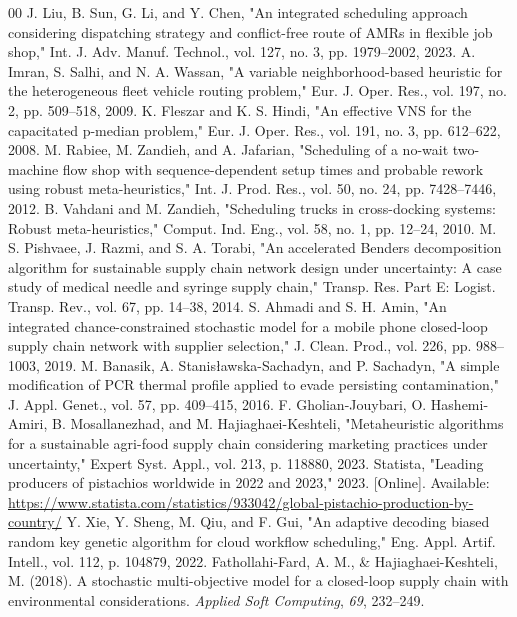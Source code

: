\documentclass[conference]{IEEEtran}
\begin{document}
\begin{thebibliography}{00}
     J. Liu, B. Sun, G. Li, and Y. Chen, "An integrated scheduling approach considering dispatching strategy and conflict-free route of AMRs in flexible job shop," Int. J. Adv. Manuf. Technol., vol. 127, no. 3, pp. 1979--2002, 2023.
     A. Imran, S. Salhi, and N. A. Wassan, "A variable neighborhood-based heuristic for the heterogeneous fleet vehicle routing problem," Eur. J. Oper. Res., vol. 197, no. 2, pp. 509--518, 2009.
     K. Fleszar and K. S. Hindi, "An effective VNS for the capacitated p-median problem," Eur. J. Oper. Res., vol. 191, no. 3, pp. 612--622, 2008.
     M. Rabiee, M. Zandieh, and A. Jafarian, "Scheduling of a no-wait two-machine flow shop with sequence-dependent setup times and probable rework using robust meta-heuristics," Int. J. Prod. Res., vol. 50, no. 24, pp. 7428--7446, 2012.
     B. Vahdani and M. Zandieh, "Scheduling trucks in cross-docking systems: Robust meta-heuristics," Comput. Ind. Eng., vol. 58, no. 1, pp. 12--24, 2010.
     M. S. Pishvaee, J. Razmi, and S. A. Torabi, "An accelerated Benders decomposition algorithm for sustainable supply chain network design under uncertainty: A case study of medical needle and syringe supply chain," Transp. Res. Part E: Logist. Transp. Rev., vol. 67, pp. 14--38, 2014.
     S. Ahmadi and S. H. Amin, "An integrated chance-constrained stochastic model for a mobile phone closed-loop supply chain network with supplier selection," J. Clean. Prod., vol. 226, pp. 988--1003, 2019.
     M. Banasik, A. Stanisławska-Sachadyn, and P. Sachadyn, "A simple modification of PCR thermal profile applied to evade persisting contamination," J. Appl. Genet., vol. 57, pp. 409--415, 2016.
     F. Gholian-Jouybari, O. Hashemi-Amiri, B. Mosallanezhad, and M. Hajiaghaei-Keshteli, "Metaheuristic algorithms for a sustainable agri-food supply chain considering marketing practices under uncertainty," Expert Syst. Appl., vol. 213, p. 118880, 2023.
     Statista, "Leading producers of pistachios worldwide in 2022 and 2023," 2023. [Online]. Available: \url{https://www.statista.com/statistics/933042/global-pistachio-production-by-country/}
     Y. Xie, Y. Sheng, M. Qiu, and F. Gui, "An adaptive decoding biased random key genetic algorithm for cloud workflow scheduling," Eng. Appl. Artif. Intell., vol. 112, p. 104879, 2022.
     Fathollahi-Fard, A. M., \& Hajiaghaei-Keshteli, M. (2018). A stochastic multi-objective model for a closed-loop supply chain with environmental considerations. \textit{Applied Soft Computing}, \textit{69}, 232--249.

\end{thebibliography}
\end{document}
